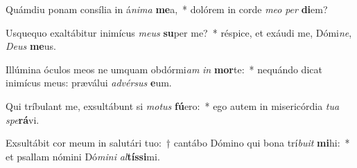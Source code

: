 \item Quámdiu ponam consília in á\textit{ni}\textit{ma} \textbf{me}a,~* dolórem in corde \textit{me}\textit{o} \textit{per} \textbf{di}em?
\item Usquequo exaltábitur inimícus \textit{me}\textit{us} \textbf{su}per me?~* réspice, et exáudi me, Dómi\textit{ne}, \textit{De}\textit{us} \textbf{me}us.
\item Illúmina óculos meos ne umquam obdórmi\textit{am} \textit{in} \textbf{mor}te:~* nequándo dicat inimícus meus: præválui \textit{ad}\textit{vér}\textit{sus} \textbf{e}um.
\item Qui tríbulant me, exsultábunt si \textit{mo}\textit{tus} \textbf{fú}ero:~* ego autem in misericórdia \textit{tu}\textit{a} \textit{spe}\textbf{rá}vi.
\item Exsultábit cor meum in salutári tuo:~† cantábo Dómino qui bona trí\textit{bu}\textit{it} \textbf{mi}hi:~* et psallam nómini Dó\textit{mi}\textit{ni} \textit{al}\textbf{tís}\textbf{si}mi.
